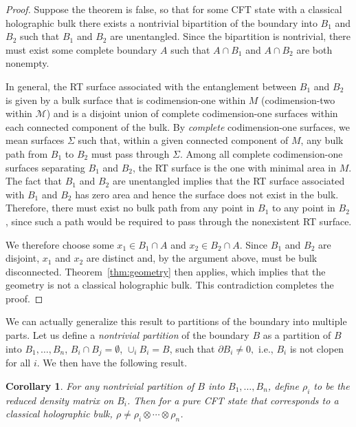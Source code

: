 \documentclass[12pt,english]{article}
\newtheorem{corollary}{Corollary}[theorem]
\begin{document}
\begin{proof}

Suppose the theorem is false, so that for some CFT state with a classical holographic bulk there exists a nontrivial bipartition of the boundary into $B_1$ and $B_2$ such that $B_1$ and $B_2$ are unentangled. Since the bipartition is nontrivial, there must exist some complete boundary $A$ such that $A\cap B_1$ and $A \cap B_2$ are both nonempty.

In general, the RT surface associated with the entanglement between $B_1$ and $B_2$ is given by a bulk surface that is codimension-one within $M$ (codimension-two within $\mathcal{M}$) and is a disjoint union of complete codimension-one surfaces within each connected component of the bulk. By {\it complete} codimension-one surfaces, we mean surfaces $\Sigma$ such that, within a given connected component of $M$, any bulk path from $B_1$ to $B_2$ must pass through $\Sigma$. Among all complete codimension-one surfaces separating $B_1$ and $B_2$, the RT surface is the one with minimal area in $M$. The fact that $B_1$ and $B_2$ are unentangled implies that the RT surface associated with $B_1$ and $B_2$ has zero area and hence the surface does not exist in the bulk. Therefore, there must exist no bulk path from any point in $B_1$ to any point in $B_2$, since such a path would be required to pass through the nonexistent RT surface.

We therefore choose some $x_1 \in B_1 \cap A$ and $x_2 \in B_2 \cap A$. Since $B_1$ and $B_2$ are disjoint, $x_1$ and $x_2$ are distinct and, by the argument above, must be bulk disconnected. Theorem~\ref{thm:geometry} then applies, which implies that the geometry is not a classical holographic bulk. This contradiction completes the proof.
\end{proof}

We can actually generalize this result to partitions of the boundary into multiple parts. Let us define a {\it nontrivial partition} of the boundary $B$ as a partition of $B$ into $B_1,\ldots,B_n$, $B_i \cap B_j=\emptyset$, $\cup_i B_i=B$, such that $\partial B_i \neq 0,$ i.e., $B_i$ is not clopen for all $i$. We then have the following result.

\begin{corollary}
For any nontrivial partition of $B$ into $B_1,\ldots,B_n$, define $\rho_i$ to be the reduced density matrix on $B_i$. Then for a pure CFT state that corresponds to a classical holographic bulk, $\rho \neq \rho_i \otimes \cdots \otimes \rho_n$.
\end{corollary}
\end{document}
